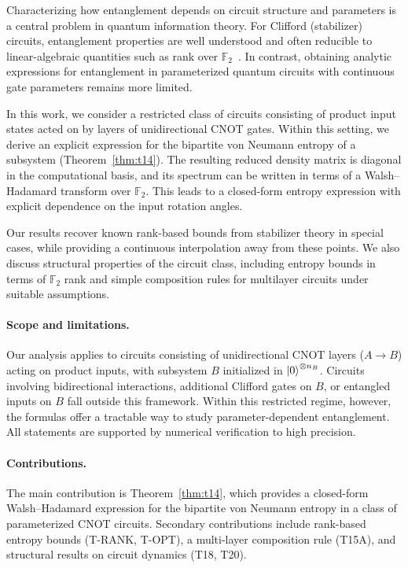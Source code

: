 \documentclass[11pt,a4paper]{article}
\newcommand{\F}{\mathbb{F}}
\begin{document}
Characterizing how entanglement depends on circuit structure and parameters is
a central problem in quantum information theory.  For Clifford (stabilizer)
circuits, entanglement properties are well understood and often reducible to
linear-algebraic quantities such as rank over $\F_2$~\cite{audenaert2005entanglement,fattal2004entanglement}.
In contrast, obtaining analytic expressions for entanglement in parameterized
quantum circuits with continuous gate parameters remains more limited.

In this work, we consider a restricted class of circuits consisting of product
input states acted on by layers of unidirectional CNOT gates.  Within this
setting, we derive an explicit expression for the bipartite von Neumann entropy
of a subsystem (Theorem~\ref{thm:t14}).  The resulting reduced density matrix
is diagonal in the computational basis, and its spectrum can be written in
terms of a Walsh--Hadamard transform over $\F_2$.  This leads to a closed-form
entropy expression with explicit dependence on the input rotation angles.

Our results recover known rank-based bounds from stabilizer theory in special
cases, while providing a continuous interpolation away from these points.  We
also discuss structural properties of the circuit class, including entropy
bounds in terms of $\F_2$ rank and simple composition rules for multilayer
circuits under suitable assumptions.

\paragraph{Scope and limitations.}
Our analysis applies to circuits consisting of unidirectional CNOT layers
($A \to B$) acting on product inputs, with subsystem $B$ initialized in
$\ket{0}^{\otimes n_B}$.  Circuits involving bidirectional interactions,
additional Clifford gates on $B$, or entangled inputs on $B$ fall outside this
framework.  Within this restricted regime, however, the formulas offer a
tractable way to study parameter-dependent entanglement.  All statements are
supported by numerical verification to high precision.

\paragraph{Contributions.}
The main contribution is Theorem~\ref{thm:t14}, which provides a closed-form
Walsh--Hadamard expression for the bipartite von Neumann entropy in a class of
parameterized CNOT circuits.  Secondary contributions include rank-based
entropy bounds (T-RANK, T-OPT), a multi-layer composition rule (T15A), and
structural results on circuit dynamics (T18, T20).
\end{document}
